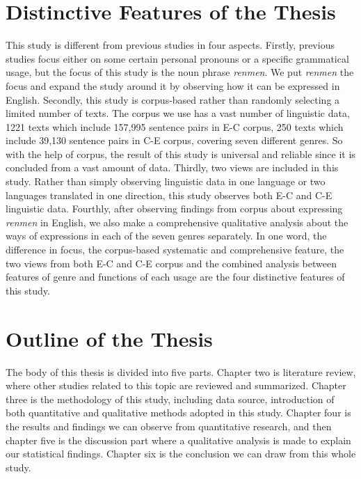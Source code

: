 \documentclass[degree=bachelor,language=english]{sysuthesis}
\begin{document}
\section{Distinctive Features of the Thesis}

This study is different from previous studies in four aspects. Firstly, previous studies focus either on some certain personal pronouns or a specific grammatical usage, but the focus of this study is the noun phrase \emph{renmen}. We put \emph{renmen} the focus and expand the study around it by observing how it can be expressed in English. Secondly, this study is corpus-based rather than randomly selecting a limited number of texts. The corpus we use has a vast number of linguistic data, 1221 texts which include 157,995 sentence pairs in E-C corpus, 250 texts which include 39,130 sentence pairs in C-E corpus, covering seven different genres. So with the help of corpus, the result of this study is universal and reliable since it is concluded from a vast amount of data. Thirdly, two views are included in this study. Rather than simply observing linguistic data in one language or two languages translated in one direction, this study observes both E-C and C-E linguistic data. Fourthly, after observing findings from corpus about expressing \emph{renmen} in English, we also make a comprehensive qualitative analysis about the ways of expressions in each of the seven  genres separately. In one word, the difference in focus, the corpus-based systematic and comprehensive feature, the two views from both E-C and C-E corpus and the combined analysis between features of genre and functions of each usage are the four distinctive features of this study.



\section{Outline of the Thesis}

The body of this thesis is divided into five parts. Chapter two is literature review, where other studies related to this topic are reviewed and summarized. Chapter three is the methodology of this study, including data source, introduction of both quantitative and qualitative methods adopted in this study. Chapter four is the results and findings we can observe from quantitative research, and then chapter five is the discussion part where a qualitative analysis is made to explain our statistical findings. Chapter six is the conclusion we can draw from this whole study.
\end{document}
